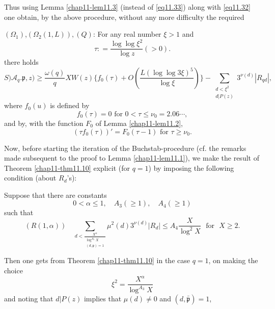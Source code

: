 Thus using Lemma \ref{chap11-lem11.3} (instead of \eqref{eq11.33})
along with \eqref{eq11.32} one obtain, by the above procedure, without
any more difficulty the required  

\begin{theorem}\label{chap11-thm11.10}
 $(\Omega _1)$,\pageoriginale $(\Omega_2(1, L)),(Q)$: For any real
  number $\xi>1$ and  
\begin{equation*}
\tau : = \frac{\log \log \xi^2}{\log z }(> 0).\tag{11.57}\label{eq11.57}
\end{equation*}
there holds
\begin{equation*}
S)\mathscr{A}_q.  \mathfrak{p} ,z) \ge \frac{\omega (q)}{q}X
W(z)\bigg\{ f_0 (\tau) + O (\frac{L(\log \log 3 \xi )^5}{\log
  \xi})\bigg\}- \sum_{\substack{d< \xi ^2\\d|P(z)}}
3^{\nu(d)}|R_{qd}|,\tag{11.58}\label{eq11.58} 
\end{equation*}
where $f_0(u)$ is defined by  
\begin{equation*}
f_0(\tau) =0   \text{ for }    0 < \tau\leq \nu_0 = 2.06 \cdots,
\tag{11.59}\label{eq11.59} 
\end{equation*}
and by, with the function $F_0$ of Lemma \ref{chap11-lem11.2},
\begin{equation*}
(\tau f_0 (\tau))' =F_0(\tau -1) \text { for } \tau \ge
  \nu_0. \tag{11.60}\label{eq11.60} 
\end{equation*}
\end{theorem}

Now, before starting the iteration of the Buchstab-procedure (cf. the
remarks made subsequent to the proof to Lemma \ref{chap11-lem11.1}), we make the
result of Theorem \ref{chap11-thm11.10} explicit (for $q=1$) by
imposing the following condition (about $R_d$'s):	 

Suppose that there are constants 
\begin{equation*}
0< \alpha \leqslant 1,    \quad A_3 (\geqslant 1) , \quad
A_4(\geqslant 1)\tag{11.61}\label{eq11.61} 
\end{equation*}
such that
\begin{equation*}
 (R(1, \alpha))\quad\sum_{d< \frac{X^\alpha}{{\substack{ \log
          ^{A_{3}} X\\(d,\mathfrak{p})=1}}}}\mu^2 (d) 3
  ^{\nu(d)}|R_d|\leqslant A_4 \frac{X}{\log ^2 X} \text{~ for~ } X
  \geqslant 2. \tag{11.62}\label{eq11.62} 
\end{equation*}

Then one gets from Theorem \ref{chap11-thm11.10} in the case $q=1$, on
making the choice  
\begin{equation*}
\xi ^2 = \frac{X^\alpha}{\log ^{A_{3}}X}  \tag{11.63}\label{eq11.63}
\end{equation*}
and noting   that $d|P(z)$  implies that $\mu(d)\neq 0$ and
$(d,\bar{\mathfrak{p}})=1$, 


